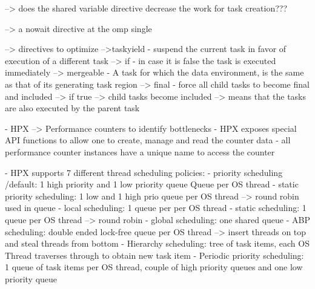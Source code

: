     --> does the shared variable directive decrease the work for task creation???
    
    --> a nowait directive at the omp single
    
    \cite{MKlemm.2018}
 --> directives to optimize
 	-->taskyield - suspend the current task in favor of execution of a different task
 	--> if - in case it is false the task is executed immediately
 	--> mergeable - A task for which the data environment, is the same as that of its generating task region
 	--> final - force all child tasks to become final and included
 		--> if true --> child tasks become included --> means that the tasks are also executed by the parent task

  \cite{TheSTEARGroup.2020}
    - HPX --> Performance counters to identify bottlenecks
    - HPX exposes special API functions to allow one to create, manage and read the counter data
    - all performance counter instances have a unique name to access the counter


  \cite{hpxMP.2019}
  \cite{TheSTEARGroup.2020}
    - HPX supports 7 different thread scheduling policies:
      - priority scheduling /default: 1 high priority and 1 low priority queue Queue per OS thread
      - static priority scheduling: 1 low and 1 high prio queue per OS thread --> round robin used in queue
      - local scheduling: 1 queue per per OS thread
      - static scheduling: 1 queue per OS thread --> round robin
      - global scheduling: one shared queue
      - ABP scheduling: double ended lock-free queue per OS thread --> insert threads on top and steal threads from bottom
      - Hierarchy scheduling: tree of task items, each OS Thread traverses through to obtain new task item
      - Periodic priority scheduling: 1 queue of task items per OS thread, couple of high priority queues and one low priority queue
      